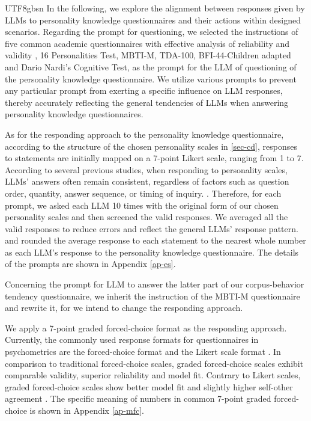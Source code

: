 \documentclass{article}
\theoremstyle{plain}
\theoremstyle{definition}
\theoremstyle{remark}
\begin{document}
\begin{CJK*}{UTF8}{gbsn}
In the following, we explore the alignment between responses given by LLMs to personality knowledge questionnaires and their actions within designed scenarios. Regarding the prompt for questioning, we selected the instructions of five common academic questionnaires with effective analysis of reliability and validity \citep{makwana2020confirmatory, johnson1998third, goldberg1992development, john1991big, nardi2011neuroscience}, 16 Personalities Test, MBTI-M, TDA-100, BFI-44-Children adapted and Dario Nardi's Cognitive Test, as the prompt for the LLM of questioning of the personality knowledge questionnaire. We utilize various prompts to prevent any particular prompt from exerting a specific influence on LLM responses, thereby accurately reflecting the general tendencies of LLMs when answering personality knowledge questionnaires.


As for the responding approach to the personality knowledge questionnaire, according to the structure of the chosen personality scales in \ref{sec-cd}, responses to statements are initially mapped on a 7-point Likert scale, ranging from 1 to 7.  According to several previous studies, when responding to personality scales, LLMs' answers often remain consistent, regardless of factors such as question order, quantity, answer sequence, or timing of inquiry. \citep{huang2023revisiting, safdari2023personality}. Therefore, for each prompt, we asked each LLM 10 times with the original form of our chosen personality scales and then screened the valid responses. We averaged all the valid responses to reduce errors and reflect the general LLMs’ response pattern. and rounded the average response to each statement to the nearest whole number as each LLM's response to the personality knowledge questionnaire. The details of the prompts are shown in Appendix \ref{ap-es}.

Concerning the prompt for LLM to answer the latter part of our corpus-behavior tendency questionnaire, we inherit the instruction of the MBTI-M questionnaire \citep{gu2012mbti} and rewrite it, for we intend to change the responding approach.

We apply a 7-point graded forced-choice format \citep{brown2018ordinal} as the responding approach. Currently, the commonly used response formats for questionnaires in psychometrics are the forced-choice format \citep{sisson1948forced} and the Likert scale format \citep{joshi2015likert}. In comparison to traditional forced-choice scales, graded forced-choice scales exhibit comparable validity, superior reliability and model fit. Contrary to Likert scales, graded forced-choice scales show better model fit and slightly higher self-other agreement \citep{zhang2023moving}. The specific meaning of numbers in common 7-point graded forced-choice is shown in Appendix \ref{ap-mfc}.


\end{CJK*}
\end{document}
